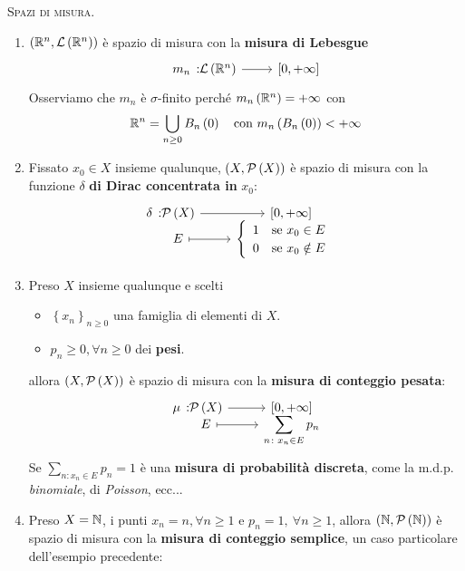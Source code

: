 \begin{examples}\textsc{Spazi di misura.}
	\begin{enumerate}
		\item $\left(\mathbb{R}^n,\mathcal{L}\left(\mathbb{R}^n\right)\right)$ è spazio di misura con la \textbf{misura di Lebesgue}
		\begin{equation}
			\funz{m_n}{\mathcal{L}\left(\realset^n\right)}{\left[0,+\infty\right]}
		\end{equation}
		Osserviamo che $m_n$ è $\sigma$-finito perché $m_n\left(\mathbb{R}^n\right)=+\infty$ con
		\begin{equation*}
			\mathbb{R}^n=\bigcup_{n\geq 0}B_n\left(0\right)\quad\text{con }m_n\left(B_n\left(0\right)\right)<+\infty
		\end{equation*}
		\item Fissato $x_0\in X$ insieme qualunque, $\left(X,\mathcal{P}\left(X\right)\right)$ è spazio di misura con la funzione $\delta$ \textbf{di Dirac concentrata in} $x_0$:
		\begin{equation}
			\funztot{\delta}{\setpart{X}}{\left[0,+\infty\right]}{E}{\begin{cases}
					\begin{array}{ll}
						1&\text{se }x_0\in E\\
						0&\text{se }x_0\notin E
					\end{array}
			\end{cases}}
		\end{equation}
		\item Preso $X$ insieme qualunque e scelti
		\begin{itemize}
			\item $\left\{x_n\right\}_{n\geq 0}$ una famiglia di elementi di $X$.
			\item $p_n\geq 0, \forall n\geq 0$ dei \textbf{pesi}.
		\end{itemize}
	allora $\left(X,\mathcal{P}\left(X\right)\right)$ è spazio di misura con la \textbf{misura di conteggio pesata}:
	\begin{equation}
		\funztot{\mu}{\setpart{X}}{\left[0,+\infty\right]}{E}{\displaystyle\sum_{n\colon x_n\in E}p_n}
	\end{equation}
Se $\displaystyle\sum_{n\colon x_n\in E}p_n=1$ è una \textbf{misura di probabilità discreta}, come la m.d.p. \textit{binomiale}, di \textit{Poisson}, ecc...\\
\item Preso $X=\mathbb{N}$, i punti $x_n=n, \forall n\geq 1$ e $p_n=1,\ \forall n\geq 1$, allora $\left(\mathbb{N},\mathcal{P}\left(\mathbb{N}\right)\right)$ è spazio di misura con la \textbf{misura di conteggio semplice}, un caso particolare dell'esempio precedente:

\end{enumerate}
\end{examples}
